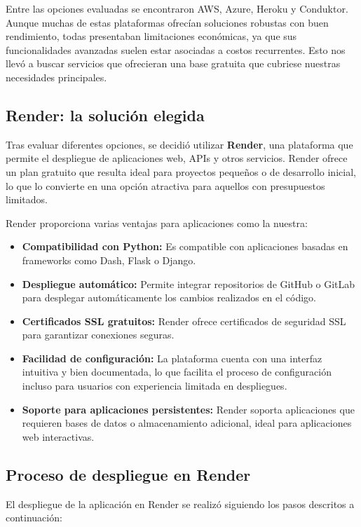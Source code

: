 Entre las opciones evaluadas se encontraron AWS, Azure, Heroku y Conduktor. Aunque muchas de estas plataformas ofrecían soluciones robustas con buen rendimiento, todas presentaban limitaciones económicas, ya que sus funcionalidades avanzadas suelen estar asociadas a costos recurrentes. Esto nos llevó a buscar servicios que ofrecieran una base gratuita que cubriese nuestras necesidades principales.

\subsection{Render: la solución elegida}

Tras evaluar diferentes opciones, se decidió utilizar \textbf{Render}, una plataforma que permite el despliegue de aplicaciones web, APIs y otros servicios. Render ofrece un plan gratuito que resulta ideal para proyectos pequeños o de desarrollo inicial, lo que lo convierte en una opción atractiva para aquellos con presupuestos limitados.

Render proporciona varias ventajas para aplicaciones como la nuestra:
\begin{itemize}
    \item \textbf{Compatibilidad con Python:} Es compatible con aplicaciones basadas en frameworks como Dash, Flask o Django.
    \item \textbf{Despliegue automático:} Permite integrar repositorios de GitHub o GitLab para desplegar automáticamente los cambios realizados en el código.
    \item \textbf{Certificados SSL gratuitos:} Render ofrece certificados de seguridad SSL para garantizar conexiones seguras.
    \item \textbf{Facilidad de configuración:} La plataforma cuenta con una interfaz intuitiva y bien documentada, lo que facilita el proceso de configuración incluso para usuarios con experiencia limitada en despliegues.
    \item \textbf{Soporte para aplicaciones persistentes:} Render soporta aplicaciones que requieren bases de datos o almacenamiento adicional, ideal para aplicaciones web interactivas.
\end{itemize}

\subsection{Proceso de despliegue en Render}

El despliegue de la aplicación en Render se realizó siguiendo los pasos descritos a continuación:

